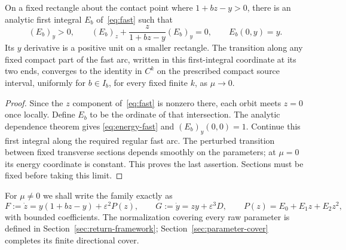 \begin{lemma}\label{lem:fast-energy}
On a fixed rectangle about the contact point where $1+bz-y>0$,
there is an analytic first integral $E_b$ of~\eqref{eq:fast} such that
\begin{equation}\label{eq:energy-fast}
 (E_b)_y>0,\qquad
 (E_b)_z+\frac{z}{1+bz-y}(E_b)_y=0,\qquad
 E_b(0,y)=y.
\end{equation}
Its $y$ derivative is a positive unit on a smaller rectangle. The
transition along any fixed compact part of the fast arc, written in
this first-integral coordinate at its two ends, converges to the
identity in $C^k$ on the prescribed compact source interval, uniformly
for $b\in I_b$, for every fixed finite $k$, as $\mu\to0$.
\end{lemma}
\begin{proof}
Since the $z$ component of~\eqref{eq:fast} is nonzero there, each
orbit meets $z=0$ once locally. Define $E_b$ to be the ordinate of
that intersection. The analytic dependence theorem gives
\eqref{eq:energy-fast} and $(E_b)_y(0,0)=1$. Continue this first
integral along the required regular fast arc. The perturbed transition
between fixed transverse sections depends smoothly on the parameters;
at $\mu=0$ its energy coordinate is constant. This proves the last
assertion. Sections must be fixed before taking this limit.
\end{proof}

For $\mu\ne0$ we shall write the family exactly as
\begin{equation}\label{eq:normalized}
 F:=\dot z=y(1+bz-y)+\varepsilon^2P(z),\qquad
 G:=\dot y=zy+\varepsilon^3D,
 \qquad P(z)=E_0+E_1z+E_2z^2,
\end{equation}
with bounded coefficients. The normalization covering every raw
parameter is defined in Section~\ref{sec:return-framework};
Section~\ref{sec:parameter-cover} completes its finite directional cover.

